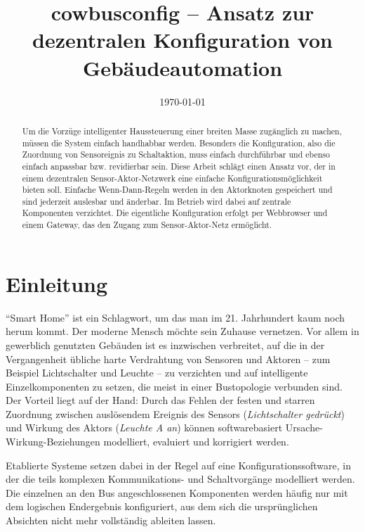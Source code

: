 \documentclass[conference]{IEEEtran}
\begin{document}
\title{cowbusconfig -- Ansatz zur dezentralen Konfiguration von Gebäudeautomation}
\author{
\and
{} 
}
\date{\today}



\maketitle

\begin{abstract}
    Um die Vorzüge intelligenter Haussteuerung einer breiten Masse zugänglich
    zu machen, müssen die System einfach handhabbar werden.
    Besonders die Konfiguration, also die Zuordnung von Sensoreignis zu
    Schaltaktion, muss einfach durchführbar und ebenso einfach anpassbar
    bzw. revidierbar sein. Diese Arbeit schlägt einen Ansatz vor,
    der in einem dezentralen Sensor-Aktor-Netzwerk eine einfache
    Konfigurationsmöglichkeit bieten soll.
    Einfache Wenn-Dann-Regeln werden in den Aktorknoten gespeichert und
    sind jederzeit auslesbar und änderbar.
    Im Betrieb wird dabei auf zentrale Komponenten verzichtet.
    Die eigentliche Konfiguration erfolgt per Webbrowser und einem Gateway,
    das den Zugang zum Sensor-Aktor-Netz ermöglicht.
\end{abstract}

\section{Einleitung}
    \enquote{Smart Home} ist ein Schlagwort, um das man im 21. Jahrhundert
    kaum noch herum kommt. Der moderne Mensch möchte sein Zuhause vernetzen.
    Vor allem in gewerblich genutzten Gebäuden ist es inzwischen verbreitet,
    auf die in der Vergangenheit übliche harte Verdrahtung von Sensoren und
    Aktoren -- zum Beispiel Lichtschalter und Leuchte -- zu verzichten
    und auf intelligente Einzelkomponenten zu setzen, die meist in einer
    Bustopologie verbunden sind. Der Vorteil liegt auf der Hand:
    Durch das Fehlen der festen und starren Zuordnung zwischen auslösendem
    Ereignis des Sensors (\emph{Lichtschalter gedrückt})
    und Wirkung des Aktors (\emph{Leuchte A an})
    können softwarebasiert Ursache-Wirkung-Beziehungen modelliert, evaluiert
    und korrigiert werden.

    Etablierte Systeme setzen dabei in der Regel auf eine
    Konfigurationssoftware, in der die teils komplexen Kommunikations- und
    Schaltvorgänge modelliert werden.
    Die einzelnen an den Bus angeschlossenen Komponenten werden häufig nur
    mit dem logischen Endergebnis konfiguriert,
    aus dem sich die ursprünglichen Absichten nicht mehr vollständig ableiten
    lassen.
\end{document}
